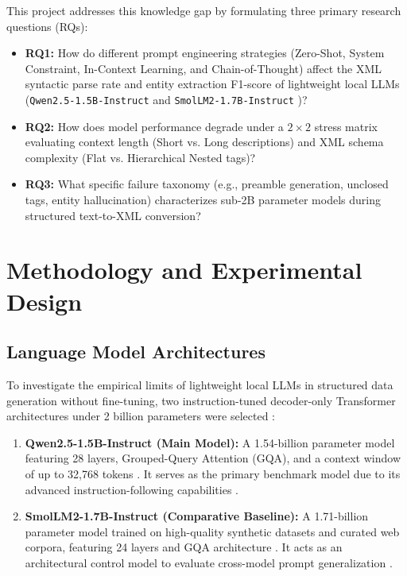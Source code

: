\documentclass[11pt,a4paper]{article}
\begin{document}
This project addresses this knowledge gap by formulating three primary research questions (RQs):
\begin{itemize}
    \item \textbf{RQ1:} How do different prompt engineering strategies (Zero-Shot, System Constraint, In-Context Learning, and Chain-of-Thought) affect the XML syntactic parse rate and entity extraction F1-score of lightweight local LLMs (\texttt{Qwen2.5-1.5B-Instruct} \cite{qwen25} and \texttt{SmolLM2-1.7B-Instruct} \cite{smollm2})?
    \item \textbf{RQ2:} How does model performance degrade under a $2 \times 2$ stress matrix evaluating context length (Short vs. Long descriptions) and XML schema complexity (Flat vs. Hierarchical Nested tags)?
    \item \textbf{RQ3:} What specific failure taxonomy (e.g., preamble generation, unclosed tags, entity hallucination) characterizes sub-2B parameter models during structured text-to-XML conversion?
\end{itemize}

\section{Methodology and Experimental Design}

\subsection{Language Model Architectures}
To investigate the empirical limits of lightweight local LLMs in structured data generation without fine-tuning, two instruction-tuned decoder-only Transformer architectures under 2 billion parameters were selected \cite{qwen25, smollm2}:
\begin{enumerate}
    \item \textbf{Qwen2.5-1.5B-Instruct (Main Model):} A 1.54-billion parameter model featuring 28 layers, Grouped-Query Attention (GQA), and a context window of up to 32,768 tokens \cite{qwen25}. It serves as the primary benchmark model due to its advanced instruction-following capabilities \cite{qwen25}.
    \item \textbf{SmolLM2-1.7B-Instruct (Comparative Baseline):} A 1.71-billion parameter model trained on high-quality synthetic datasets and curated web corpora, featuring 24 layers and GQA architecture \cite{smollm2}. It acts as an architectural control model to evaluate cross-model prompt generalization \cite{smollm2}.
\end{enumerate}
\end{document}
